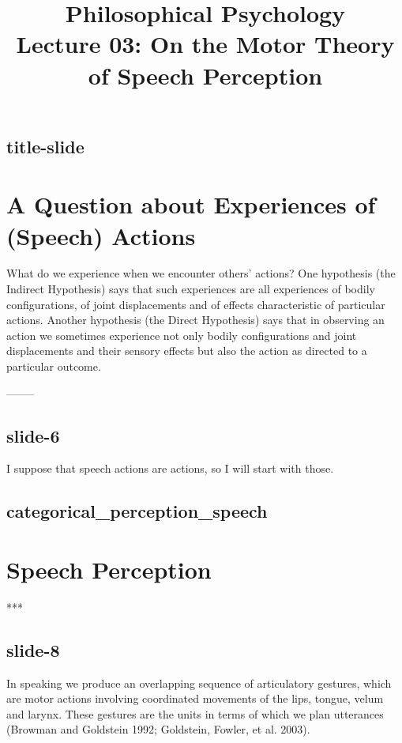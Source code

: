 \documentclass[12pt,\papersize]{extarticle}
\begin{document}
\setlength\footnotesep{1em}










\title {Philosophical Psychology \\ Lecture 03: On the Motor Theory of Speech Perception}



\maketitle

\subsection{title-slide}


\section{A Question about Experiences of (Speech) Actions}

What do we experience when we encounter others’ actions?
One hypothesis (the Indirect Hypothesis) says that such experiences are all experiences of bodily
configurations, of joint displacements and of effects characteristic of particular actions.
Another hypothesis (the Direct Hypothesis) says that
in observing an action we sometimes experience not only bodily configurations and joint displacements
and their sensory effects but also the action as directed to a particular outcome.

--------
\subsection{slide-6}
I suppose that speech actions are actions, so I will start with those.

\subsection{categorical\_perception\_speech}


\section{Speech Perception}

***

\subsection{slide-8}
In speaking we produce an overlapping sequence of articulatory gestures, which are motor actions
involving coordinated movements of the lips, tongue, velum and larynx. These gestures are the units
in terms of which we plan utterances (Browman and Goldstein 1992; Goldstein, Fowler, et al. 2003).
\end{document}
